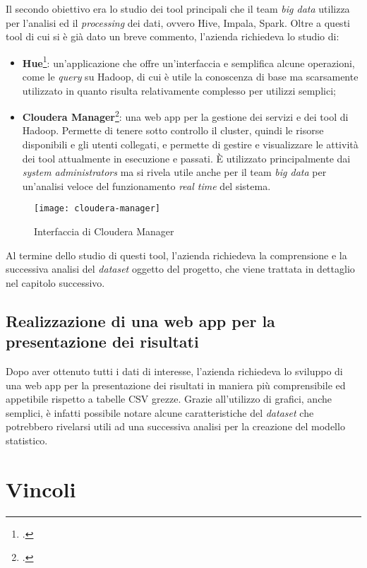 Il secondo obiettivo era lo studio dei tool principali che il team \textit{big data} utilizza per l'analisi ed il \textit{processing} dei dati, ovvero Hive, Impala, Spark. Oltre a questi tool di cui si è già dato un breve commento, l'azienda richiedeva lo studio di:
\begin{itemize}
	\item \textbf{Hue}\footcite{site:hue}: un'applicazione che offre un'interfaccia e semplifica alcune operazioni, come le \textit{query} su Hadoop, di cui è utile la conoscenza di base ma scarsamente utilizzato in quanto risulta relativamente complesso per utilizzi semplici;
	\item \textbf{Cloudera Manager}\footcite{site:cloudera}: una web app per la gestione dei servizi e dei tool di Hadoop. Permette di tenere sotto controllo il cluster, quindi le risorse disponibili e gli utenti collegati, e permette di gestire e visualizzare le attività dei tool attualmente in esecuzione e passati. È utilizzato principalmente dai \textit{system administrators} ma si rivela utile anche per il team \textit{big data} per un'analisi veloce del funzionamento \textit{real time} del sistema.
\end{itemize} 
\begin{figure}[!h] 
	\centering 
	\texttt{[image: cloudera-manager]}
	\caption{Interfaccia di Cloudera Manager}
\end{figure}
Al termine dello studio di questi tool, l'azienda richiedeva la comprensione e la successiva analisi del \textit{dataset} oggetto del progetto, che viene trattata in dettaglio nel capitolo successivo.
\subsection{Realizzazione di una web app per la presentazione dei risultati}
Dopo aver ottenuto tutti i dati di interesse, l'azienda richiedeva lo sviluppo di una \gls{web app} per la presentazione dei risultati in maniera più comprensibile ed appetibile rispetto a tabelle \gls{CSV} grezze. Grazie all'utilizzo di grafici, anche semplici, è infatti possibile notare alcune caratteristiche del \textit{dataset} che potrebbero rivelarsi utili ad una successiva analisi per la creazione del modello statistico.
\section{Vincoli}
